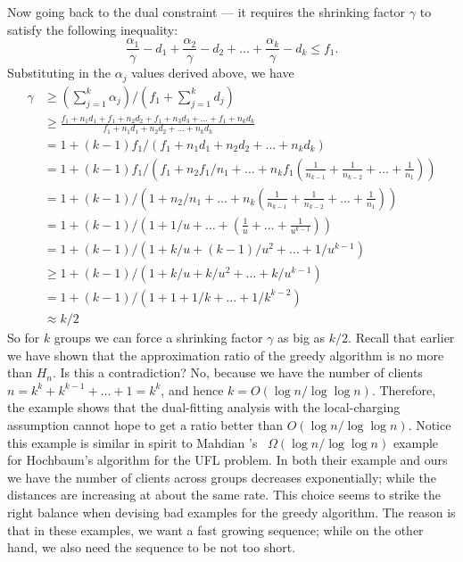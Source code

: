 \documentclass[oneside,final]{ucr}
\begin{document}
Now going back to the dual constraint --- it requires the
shrinking factor $\gamma$ to satisfy the following
inequality:
\begin{equation}
  \frac{\alpha_1}{\gamma} - d_1 + \frac{\alpha_2}{\gamma} - d_2 +
  \ldots + \frac{\alpha_k}{\gamma} - d_k \leq f_1.
\end{equation}
Substituting in the $\alpha_j$ values derived above, we have
\begin{align*}
  \gamma &\geq (\sum_{j=1}^k \alpha_j) / (f_1 + \sum_{j=1}^k d_j)\\
  &\geq \frac{f_1 + n_1 d_1 + f_1 + n_2 d_2 + f_1 + n_3 d_3 + \ldots +
    f_1 + n_k
    d_k}{f_1 + n_1 d_1 + n_2 d_2 + \ldots + n_k d_k}\\
  &= 1 + (k-1)f_1 / (f_1 + n_1 d_1 + n_2 d_2 + \ldots + n_k d_k)\\
  &= 1 + (k-1)f_1 / \left(f_1 + n_2 f_1 / n_1 + \ldots + n_k f_1
    (\frac{1}{n_{k-1}} + \frac{1}{n_{k-2}} + \ldots +
    \frac{1}{n_1})\right)\\
  &= 1 + (k-1) / \left(1 + n_2 / n_1 + \ldots + n_k
    (\frac{1}{n_{k-1}} + \frac{1}{n_{k-2}} + \ldots +
    \frac{1}{n_1})\right)\\
  &= 1 + (k-1) / \left(1 + 1/u + \ldots + (\frac{1}{u} + \ldots +
    \frac{1}{u^{k-1}})\right)\\
  &= 1 + (k-1) / \left(1 + k/u + (k-1)/u^2 + \ldots +
    1/u^{k-1}\right)\\
  &\geq 1 + (k-1) / \left(1 + k/u + k/u^2 + \ldots +
    k/u^{k-1}\right)\\
  &= 1 + (k-1) / \left(1 + 1 + 1/k + \ldots + 1/k^{k-2}\right)\\
  &\approx k/2
\end{align*}
So for $k$ groups we can force a shrinking factor $\gamma$
as big as $k/2$. Recall that earlier we have shown that the
approximation ratio of the greedy algorithm is no more than
$H_n$. Is this a contradiction? No, because we have the
number of clients $n=k^k + k^{k-1} + \ldots + 1 = k^k$, and
hence $k = O(\log n / \log\log n)$. Therefore, the example
shows that the dual-fitting analysis with the local-charging
assumption cannot hope to get a ratio better than $O(\log n
/ \log\log n)$. Notice this example is similar in spirit to
Mahdian {\etal}'s~\cite{JainMMSV03} $\Omega(\log n/ \log\log
n)$ example for Hochbaum's algorithm for the UFL problem. In
both their example and ours we have the number of clients
across groups decreases exponentially; while the distances
are increasing at about the same rate. This choice seems to
strike the right balance when devising bad examples for the
greedy algorithm. The reason is that in these examples, we
want a fast growing sequence; while on the other hand, we
also need the sequence to be not too short.
\end{document}
